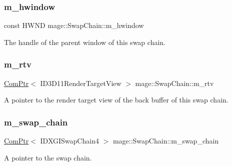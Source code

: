 \subsubsection{\texorpdfstring{m\+\_\+hwindow}{m\_hwindow}}
{\footnotesize\ttfamily const H\+W\+ND mage\+::\+Swap\+Chain\+::m\+\_\+hwindow\hspace{0.3cm}{\ttfamily [private]}}

The handle of the parent window of this swap chain. \hypertarget{classmage_1_1_swap_chain_a87610dab11ac73b2e5c2510e013640ac}{}\label{classmage_1_1_swap_chain_a87610dab11ac73b2e5c2510e013640ac} 
\subsubsection{\texorpdfstring{m\+\_\+rtv}{m\_rtv}}
{\footnotesize\ttfamily \hyperlink{namespacemage_ae74f374780900893caa5555d1031fd79}{Com\+Ptr}$<$ I\+D3\+D11\+Render\+Target\+View $>$ mage\+::\+Swap\+Chain\+::m\+\_\+rtv\hspace{0.3cm}{\ttfamily [private]}}

A pointer to the render target view of the back buffer of this swap chain. \hypertarget{classmage_1_1_swap_chain_a826bde72349ca10f7c60ca39d68dc2b2}{}\label{classmage_1_1_swap_chain_a826bde72349ca10f7c60ca39d68dc2b2} 
\subsubsection{\texorpdfstring{m\+\_\+swap\+\_\+chain}{m\_swap\_chain}}
{\footnotesize\ttfamily \hyperlink{namespacemage_ae74f374780900893caa5555d1031fd79}{Com\+Ptr}$<$ I\+D\+X\+G\+I\+Swap\+Chain4 $>$ mage\+::\+Swap\+Chain\+::m\+\_\+swap\+\_\+chain\hspace{0.3cm}{\ttfamily [private]}}

A pointer to the swap chain. 